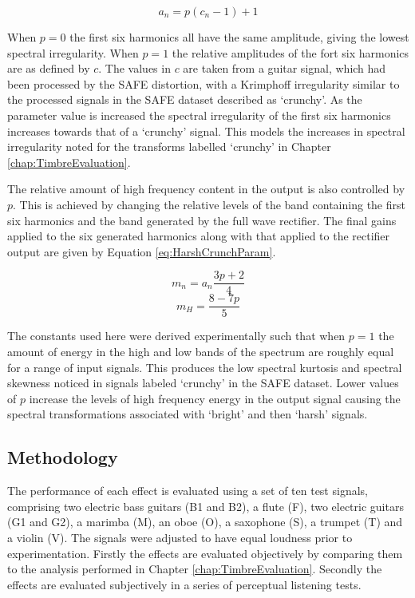 			\begin{equation}
				a_{n} = p(c_{n} - 1) + 1
				\label{eq:HarshCrunchAmps}
			\end{equation}

			When $p = 0$ the first six harmonics all have the same amplitude, giving the lowest spectral
			irregularity. When $p = 1$ the relative amplitudes of the fort six harmonics are as defined by $c$.
			The values in $c$ are taken from a guitar signal, which had been processed by the SAFE distortion,
			with a Krimphoff irregularity similar to the processed signals in the SAFE dataset described as
			`crunchy'. As the parameter value is increased the spectral irregularity of the first six harmonics
			increases towards that of a `crunchy' signal. This models the increases in spectral irregularity
			noted for the transforms labelled `crunchy' in Chapter \ref{chap:TimbreEvaluation}.
			
			The relative amount of high frequency content in the output is also controlled by $p$. This is
			achieved by changing the relative levels of the band containing the first six harmonics and the
			band generated by the full wave rectifier. The final gains applied to the six generated harmonics
			along with that applied to the rectifier output are given by Equation \ref{eq:HarshCrunchParam}.

			\[ m_{n} = a_{n}\frac{3p + 2}{4} \]
			\begin{equation}
				m_{H} = \frac{8 - 7p}{5}
				\label{eq:HarshCrunchParam}
			\end{equation}

			The constants used here were derived experimentally such that when $p = 1$ the amount of energy in
			the high and low bands of the spectrum are roughly equal for a range of input signals. This
			produces the low spectral kurtosis and spectral skewness noticed in signals labeled `crunchy' in
			the SAFE dataset. Lower values of $p$ increase the levels of high frequency energy in the output
			signal causing the spectral transformations associated with `bright' and then `harsh' signals.

	\subsection{Methodology}
	\label{sec:PerceptualExperiments-SemanticControl-Methodology}
		The performance of each effect is evaluated using a set of ten test signals, comprising two electric bass
		guitars (B1 and B2), a flute (F), two electric guitars (G1 and G2), a marimba (M), an oboe (O), a saxophone
		(S), a trumpet (T) and a violin (V). The signals were adjusted to have equal loudness prior to
		experimentation.  Firstly the effects are evaluated objectively by comparing them to the analysis performed
		in Chapter \ref{chap:TimbreEvaluation}. Secondly the effects are evaluated subjectively in a series of
		perceptual listening tests.

